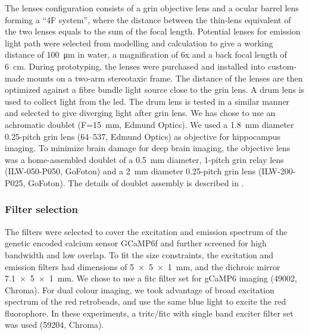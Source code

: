 The lenses configuration consists of a \gls{grin} objective lens and a ocular barrel lens forming a ``4F system'', where the distance between the thin-lens equivalent of the two lenses equals to the sum of the focal length. Potential lenses for emission light path were selected from modelling and calculation to give a working distance of \SI{100}{\um} in water, a magnification of 6x and a back focal length of \SI{6}{\cm}. During prototyping, the lenses were purchased and installed into custom-made mounts on a two-arm stereotaxic frame. The distance of the lenses are then optimized against a fibre bundle light source close to the \gls{grin} lens. A drum lens is used to collect light from the \gls{led}. The drum lens is tested in a similar manner and selected to give diverging light after \gls{grin} lens. We has chose to use an achromatic doublet (F=\SI{15}{\mm}, Edmund Optics). We used a \SI{1.8}{\mm} diameter 0.25-pitch \gls{grin} lens (64--537, Edmund Optics) as objective for hippocampus imaging. To minimize brain damage for deep brain imaging, the objective lens was a home-assembled doublet of a \SI{0.5}{\mm} diameter, 1-pitch \gls{grin} relay lens (ILW-050-P050, GoFoton) and a \SI{2}{\mm} diameter 0.25-pitch \gls{grin} lens (ILW-200-P025, GoFoton). The details of doublet assembly is described in \label{objective assmebly}.

\subsubsection{Filter selection}
The filters were selected to cover the excitation and emission spectrum of the genetic encoded calcium sensor GCaMP6f \citep{chen13} and further screened for high bandwidth and low overlap. To fit the size constraints, the excitation and emission filters had dimensions of \SI{5x5x1}{\mm}, and the dichroic mirror \SI{7.1x5x1}{\mm}. We chose to use a \gls{fitc} filter set for gCaMP6 imaging (49002, Chroma). For dual colour imaging, we took advantage of broad excitation spectrum of the red retrobeads, and use the same blue light to excite the red fluorophore. In these experiments, a \acrshort{tritc}\slash\acrshort{fitc} with single band exciter filter set was used (59204, Chroma).

